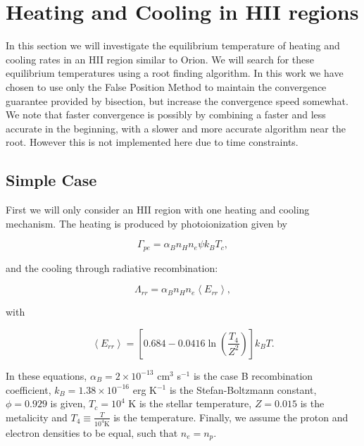 \section{Heating and Cooling in HII regions}

In this section we will investigate the equilibrium temperature of heating and cooling rates in an HII region similar to Orion. We will search for these equilibrium temperatures using a root finding algorithm. In this work we have chosen to use only the False Position Method to maintain the convergence guarantee provided by bisection, but increase the convergence speed somewhat. We note that faster convergence is possibly by combining a faster and less accurate in the beginning, with a slower and more accurate algorithm near the root. However this is not implemented here due to time constraints.


\subsection{Simple Case}

First we will only consider an HII region with one heating and cooling mechanism. The heating is produced by photoionization given by

\begin{equation}
    \Gamma_{pe} = \alpha_B n_H n_e \psi k_B T_c,\label{eq:gamma_pe}
\end{equation}

and the cooling through radiative recombination:

\begin{equation}
    \Lambda_{rr} = \alpha_Bn_Hn_e\left<E_{rr}\right>,\label{eq:lamda_rr}
\end{equation}

with

\begin{equation}
    \left<E_{rr}\right> = \left[0.684 - 0.0416\ln\left(\frac{T_4}{Z^2}\right)\right]k_BT.
\end{equation}

In these equations, $\alpha_B = 2 \times 10^{-13}$ cm$^3$ s$^{-1}$ is the case B recombination coefficient, $k_B = 1.38\times 10^{-16}$ erg K$^{-1}$ is the Stefan-Boltzmann constant, $\phi = 0.929$ is given, $T_c = 10^4$ K is the stellar temperature, $Z = 0.015$ is the metalicity and $T_4 \equiv \frac{T}{10^4\text{K}}$ is the temperature. Finally, we assume the proton and electron densities to be equal, such that $n_e = n_p$.

